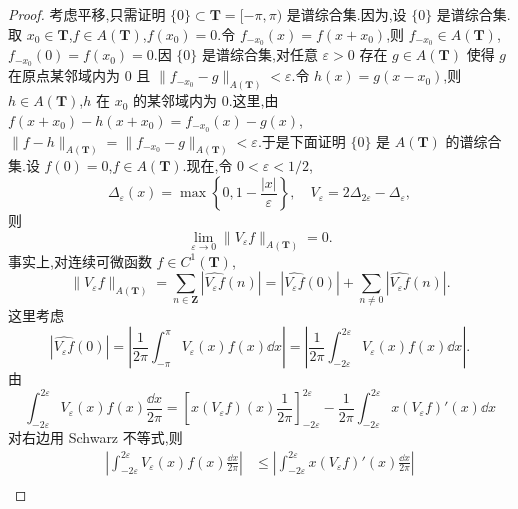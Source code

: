 \begin{proof}
考虑平移,只需证明 $\{0\} \subset \mathbf{T} = [-\pi, \pi)$ 是谱综合集.因为,设 $\{0\}$ 是谱综合集.取 $x_{0} \in \mathbf{T}$,$f \in A(\mathbf{T})$,$f(x_{0}) = 0$.令 $f_{-x_{0}}(x) = f(x + x_{0})$,则 $f_{-x_{0}} \in A(\mathbf{T})$,$f_{-x_{0}}(0) = f(x_{0}) = 0$.因 $\{0\}$ 是谱综合集,对任意 $\varepsilon > 0$ 存在 $g \in A(\mathbf{T})$ 使得 $g$ 在原点某邻域内为 $0$ 且 $\|f_{-x_{0}} - g\|_{A(\mathbf{T})} < \varepsilon$.令 $h(x) = g(x - x_{0})$,则 $h \in A(\mathbf{T})$,$h$ 在 $x_{0}$ 的某邻域内为 $0$.这里,由 $f(x + x_{0}) - h(x + x_{0}) = f_{-x_{0}}(x) - g(x)$,$\|f - h\|_{A(\mathbf{T})} = \|f_{-x_{0}} - g\|_{A(\mathbf{T})} < \varepsilon$.于是下面证明 $\{0\}$ 是 $A(\mathbf{T})$ 的谱综合集.设 $f(0) = 0$,$f \in A(\mathbf{T})$.现在,令 $0 < \varepsilon < 1/2$,
\begin{equation*}
\Delta_{\varepsilon}(x) = \max\left\{0, 1 - \frac{|x|}{\varepsilon}\right\}, \quad V_{\varepsilon} = 2\Delta_{2\varepsilon} - \Delta_{\varepsilon},
\end{equation*}
则
\begin{equation*}
\lim_{\varepsilon \to 0}\|V_{\varepsilon}f\|_{A(\mathbf{T})} = 0.
\end{equation*}
事实上,对连续可微函数 $f \in C^{1}(\mathbf{T})$,
\begin{equation*}
\|V_{\varepsilon}f\|_{A(\mathbf{T})} = \sum_{n \in \mathbf{Z}}\left|\widehat{V_{\varepsilon}f}(n)\right| = \left|\widehat{V_{\varepsilon}f}(0)\right| + \sum_{n \neq 0}\left|\widehat{V_{\varepsilon}f}(n)\right|.
\end{equation*}
这里考虑
\begin{equation*}
\left|\widehat{V_{\varepsilon}f}(0)\right| = \left|\frac{1}{2\pi}\int_{-\pi}^{\pi}V_{\varepsilon}(x)f(x)\dd x\right| = \left|\frac{1}{2\pi}\int_{-2\varepsilon}^{2\varepsilon}V_{\varepsilon}(x)f(x)\dd x\right|.
\end{equation*}
由
\begin{equation*}
\int_{-2\varepsilon}^{2\varepsilon}V_{\varepsilon}(x)f(x)\frac{\dd x}{2\pi} = \left[x(V_{\varepsilon}f)(x)\frac{1}{2\pi}\right]_{-2\varepsilon}^{2\varepsilon} - \frac{1}{2\pi}\int_{-2\varepsilon}^{2\varepsilon}x(V_{\varepsilon}f)'(x)\dd x
\end{equation*}
对右边用 Schwarz 不等式,则
\begin{align*}
\left|\int_{-2\varepsilon}^{2\varepsilon}V_{\varepsilon}(x)f(x)\frac{\dd x}{2\pi}\right| & \leq \left|\int_{-2\varepsilon}^{2\varepsilon}x(V_{\varepsilon}f)'(x)\frac{\dd x}{2\pi}\right| \\

\end{align*}
\end{proof}
